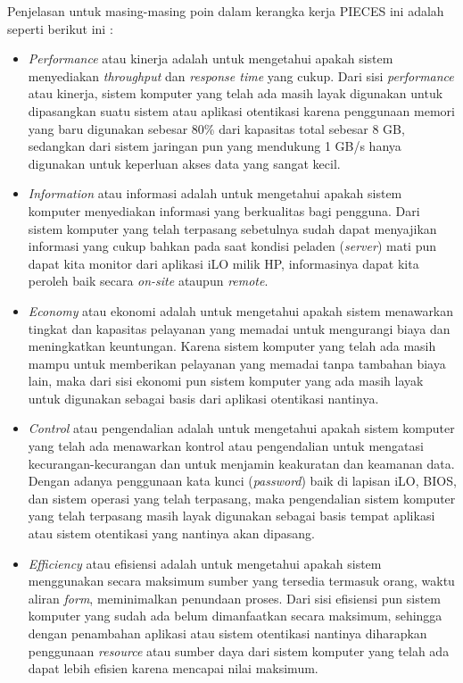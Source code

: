 \documentclass[pdftex,12pt, oneside]{article}
\begin{document}
\begin{enumerate}
Penjelasan untuk masing-masing poin dalam kerangka kerja PIECES ini adalah seperti berikut ini :

\begin{itemize}
	
	\item \textit{Performance} atau kinerja adalah untuk mengetahui apakah sistem menyediakan \textit{throughput} dan \textit{response time} yang cukup. Dari sisi \textit{performance} atau kinerja, sistem komputer yang telah ada masih layak digunakan untuk dipasangkan suatu sistem atau aplikasi otentikasi karena penggunaan memori yang baru digunakan sebesar 80\% dari kapasitas total sebesar 8 GB, sedangkan dari sistem jaringan pun yang mendukung 1 GB/s hanya digunakan untuk keperluan akses data yang sangat kecil.

	\item \textit{Information} atau informasi adalah untuk mengetahui apakah sistem komputer menyediakan informasi yang berkualitas bagi pengguna. Dari sistem komputer yang telah terpasang sebetulnya sudah dapat menyajikan informasi yang cukup bahkan pada saat kondisi peladen (\textit{server}) mati pun dapat kita monitor dari aplikasi iLO milik HP, informasinya dapat kita peroleh baik secara \textit{on-site} ataupun \textit{remote}.

	\item \textit{Economy} atau ekonomi adalah untuk mengetahui apakah sistem menawarkan tingkat dan kapasitas pelayanan yang memadai untuk mengurangi biaya dan meningkatkan keuntungan. Karena sistem komputer yang telah ada masih mampu untuk memberikan pelayanan yang memadai tanpa tambahan biaya lain, maka dari sisi ekonomi pun sistem komputer yang ada masih layak untuk digunakan sebagai basis dari aplikasi otentikasi nantinya.

	\item \textit{Control} atau pengendalian adalah untuk mengetahui apakah sistem komputer yang telah ada menawarkan kontrol atau pengendalian untuk mengatasi kecurangan-kecurangan dan untuk menjamin keakuratan dan keamanan data. Dengan adanya penggunaan kata kunci (\textit{password}) baik di lapisan iLO, BIOS, dan sistem operasi yang telah terpasang, maka pengendalian sistem komputer yang telah terpasang masih layak digunakan sebagai basis tempat aplikasi atau sistem otentikasi yang nantinya akan dipasang.

	

\item \textit{Efficiency} atau efisiensi adalah untuk mengetahui apakah sistem menggunakan secara maksimum sumber yang tersedia termasuk orang, waktu aliran \textit{form}, meminimalkan penundaan proses. Dari sisi efisiensi pun sistem komputer yang sudah ada belum dimanfaatkan secara maksimum, sehingga dengan penambahan aplikasi atau sistem otentikasi nantinya diharapkan penggunaan \textit{resource} atau sumber daya dari sistem komputer yang telah ada dapat lebih efisien karena mencapai nilai maksimum.


\end{itemize}
\end{enumerate}
\end{document}
